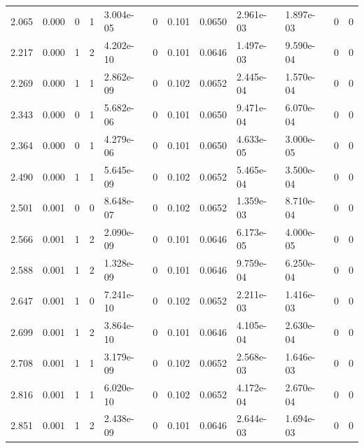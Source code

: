 \documentclass[preview]{standalone}
\begin{document}
{{\begin{tabular}{L{1.2cm}C{1.2cm} C{0.3cm}C{0.5cm} C{1.4cm}C{1.4cm} C{1.4cm}C{1.4cm} C{1.6cm}C{1.6cm} C{1.6cm}C{1.6cm}}
  2.065  &  0.000  & 0     &  1 &  3.004e-05  & 0  &  0.101&   0.0650& 2.961e-03 & 1.897e-03   &  0 & 0  \\ 
  2.217  &  0.000  & 1     &  2 &  4.202e-10  & 0  &  0.101&   0.0646& 1.497e-03 & 9.590e-04   &  0 & 0  \\ 
  2.269  &  0.000  & 1     &  1 &  2.862e-09  & 0  &  0.102&   0.0652& 2.445e-04 & 1.570e-04   &  0 & 0  \\ 
  2.343  &  0.000  & 0     &  1 &  5.682e-06  & 0  &  0.101&   0.0650& 9.471e-04 & 6.070e-04   &  0 & 0  \\ 
  2.364  &  0.000  & 0     &  1 &  4.279e-06  & 0  &  0.101&   0.0650& 4.633e-05 & 3.000e-05   &  0 & 0  \\ 
  2.490  &  0.000  & 1     &  1 &  5.645e-09  & 0  &  0.102&   0.0652& 5.465e-04 & 3.500e-04   &  0 & 0  \\ 
  2.501  &  0.001  & 0     &  0 &  8.648e-07  & 0  &  0.102&   0.0652& 1.359e-03 & 8.710e-04   &  0 & 0  \\ 
  2.566  &  0.001  & 1     &  2 &  2.090e-09  & 0  &  0.101&   0.0646& 6.173e-05 & 4.000e-05   &  0 & 0  \\ 
  2.588  &  0.001  & 1     &  2 &  1.328e-09  & 0  &  0.101&   0.0646& 9.759e-04 & 6.250e-04   &  0 & 0  \\ 
  2.647  &  0.001  & 1     &  0 &  7.241e-10  & 0  &  0.102&   0.0652& 2.211e-03 & 1.416e-03   &  0 & 0  \\ 
  2.699  &  0.001  & 1     &  2 &  3.864e-10  & 0  &  0.101&   0.0646& 4.105e-04 & 2.630e-04   &  0 & 0  \\ 
  2.708  &  0.001  & 1     &  1 &  3.179e-09  & 0  &  0.102&   0.0652& 2.568e-03 & 1.646e-03   &  0 & 0  \\ 
  2.816  &  0.001  & 1     &  1 &  6.020e-10  & 0  &  0.102&   0.0652& 4.172e-04 & 2.670e-04   &  0 & 0  \\ 
  2.851  &  0.001  & 1     &  2 &  2.438e-09  & 0  &  0.101&   0.0646& 2.644e-03 & 1.694e-03   &  0 & 0  \\ 
\hline 
\end{tabular} 

}}
\end{document}
